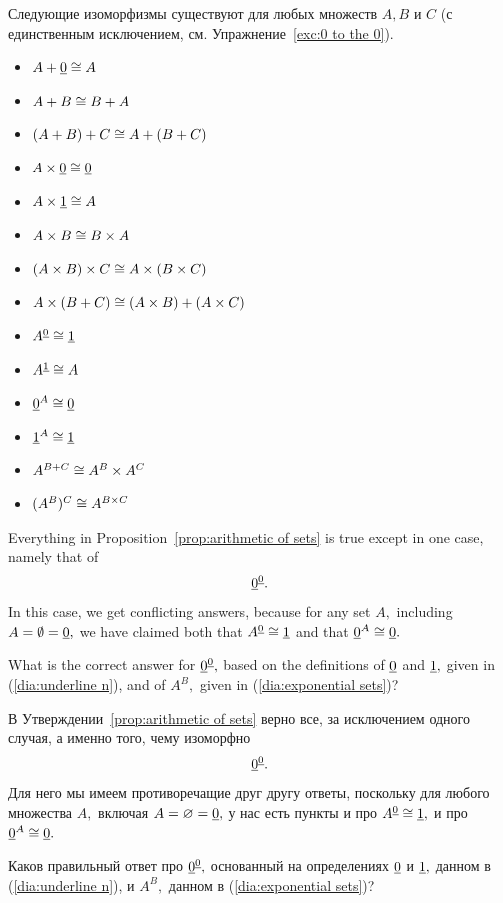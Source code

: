\documentclass[CT4S-EN-RU]{subfiles}
\begin{document}
\begin{propositionRUS}\label{prop:arithmetic of sets}
Следующие изоморфизмы существуют для любых множеств $A,B$ и $C$ (с единственным исключением, см. Упражнение~\ref{exc:0 to the 0}). 
 
\begin{itemize}
\item $A+\underline{0}\cong A$
\item $A + B\cong B + A$
\item $(A + B) + C \cong A + (B + C)$
\item $A\times\underline{0}\cong\underline{0}$
\item $A\times\underline{1}\cong A$
\item $A\times B\cong B\times A$
\item $(A\times B)\times C \cong A\times (B\times C)$
\item $A\times(B+C)\cong (A\times B)+(A\times C)$
\item $A^{\underline{0}}\cong \underline{1}$
\item $A^{\underline{1}}\cong A$
\item $\underline{0}^A\cong\underline{0}$
\item $\underline{1}^A\cong\underline{1}$
\item $A^{B+C}\cong A^B\times A^C$
\item $(A^B)^C\cong A^{B\times C}$
\end{itemize}
\end{propositionRUS}

\begin{exerciseENG}\label{exc:0 to the 0}
Everything in Proposition~\ref{prop:arithmetic of sets} is true except in one case, namely that of $$\underline{0}^{\underline{0}}.$$ In this case, we get conflicting answers, because for any set $A,$ including $A=\emptyset=\underline{0},$ we have claimed both that $A^{\underline{0}}\cong\underline{1}$ and that $\underline{0}^A\cong\underline{0}.$ 

What is the correct answer for $\underline{0}^{\underline{0}},$ based on the definitions of $\underline{0}$ and $\underline{1},$ given in (\ref{dia:underline n}), and of $A^B,$ given in (\ref{dia:exponential sets})?
\end{exerciseENG}

\begin{exerciseRUS}\label{exc:0 to the 0}
В Утверждении~\ref{prop:arithmetic of sets} верно все, за исключением одного случая, а именно того, чему изоморфно $$\underline{0}^{\underline{0}}.$$ Для него мы имеем противоречащие друг другу ответы, поскольку для любого множества $A,$ включая $A=\varnothing=\underline{0},$ у нас есть пункты и про $A^{\underline{0}}\cong\underline{1},$ и про $\underline{0}^A\cong\underline{0}.$ 

Каков правильный ответ про $\underline{0}^{\underline{0}},$ основанный на определениях $\underline{0}$ и $\underline{1},$ данном в (\ref{dia:underline n}), и $A^B,$ данном в (\ref{dia:exponential sets})?
\end{exerciseRUS}
\end{document}
